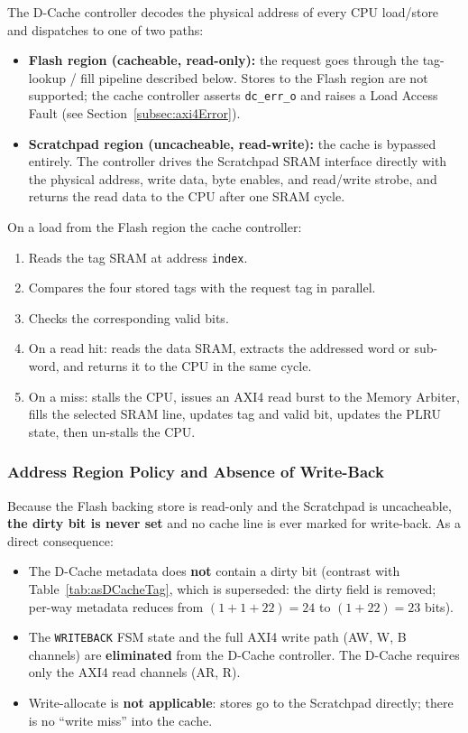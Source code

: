 The D-Cache controller decodes the physical address of every CPU load/store
and dispatches to one of two paths:

\begin{itemize}
  \item \textbf{Flash region (cacheable, read-only):} the request goes
    through the tag-lookup / fill pipeline described below.
    Stores to the Flash region are not supported; the cache controller
    asserts \texttt{dc\_err\_o} and raises a Load Access Fault (see Section~\ref{subsec:axi4Error}).
  \item \textbf{Scratchpad region (uncacheable, read-write):} the cache is
    bypassed entirely.
    The controller drives the Scratchpad SRAM interface directly with the
    physical address, write data, byte enables, and read/write strobe, and
    returns the read data to the CPU after one SRAM cycle.
\end{itemize}

On a load from the Flash region the cache controller:
\begin{enumerate}
  \item Reads the tag SRAM at address \texttt{index}.
  \item Compares the four stored tags with the request tag in parallel.
  \item Checks the corresponding valid bits.
  \item On a read hit: reads the data SRAM, extracts the addressed word or
    sub-word, and returns it to the CPU in the same cycle.
  \item On a miss: stalls the CPU, issues an AXI4 read burst to the Memory
    Arbiter, fills the selected SRAM line, updates tag and valid bit,
    updates the PLRU state, then un-stalls the CPU.
\end{enumerate}

\subsubsection{Address Region Policy and Absence of Write-Back}

Because the Flash backing store is read-only and the Scratchpad is
uncacheable, \textbf{the dirty bit is never set} and no cache line is ever
marked for write-back.
As a direct consequence:

\begin{itemize}
  \item The D-Cache metadata does \textbf{not} contain a dirty bit
    (contrast with Table~\ref{tab:asDCacheTag}, which is superseded:
    the dirty field is removed; per-way metadata reduces from
    $(1+1+22)=24$ to $(1+22)=23$ bits).
  \item The \texttt{WRITEBACK} FSM state and the full AXI4 write path
    (AW, W, B channels) are \textbf{eliminated} from the D-Cache
    controller.
    The D-Cache requires only the AXI4 read channels (AR, R).
  \item Write-allocate is \textbf{not applicable}: stores go to the
    Scratchpad directly; there is no ``write miss'' into the cache.
\end{itemize}


